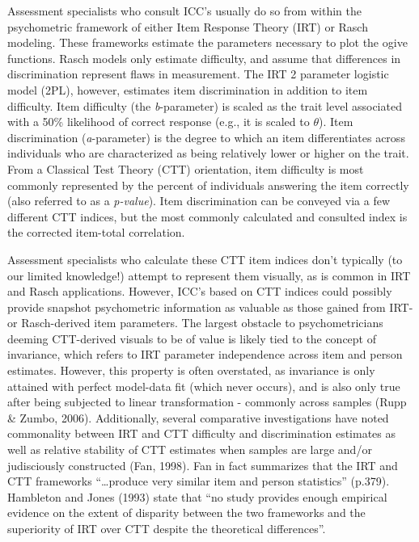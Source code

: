 \documentclass[
  man]{apa6}
\begin{document}
Assessment specialists who consult ICC's usually do so from within the psychometric framework of either Item Response Theory (IRT) or Rasch modeling. These frameworks estimate the parameters necessary to plot the ogive functions. Rasch models only estimate difficulty, and assume that differences in discrimination represent flaws in measurement. The IRT 2 parameter logistic model (2PL), however, estimates item discrimination in addition to item difficulty. Item difficulty (the \emph{b}-parameter) is scaled as the trait level associated with a 50\% likelihood of correct response (e.g., it is scaled to \(\theta\)). Item discrimination (\emph{a}-parameter) is the degree to which an item differentiates across individuals who are characterized as being relatively lower or higher on the trait. From a Classical Test Theory (CTT) orientation, item difficulty is most commonly represented by the percent of individuals answering the item correctly (also referred to as a \emph{p-value}). Item discrimination can be conveyed via a few different CTT indices, but the most commonly calculated and consulted index is the corrected item-total correlation.

Assessment specialists who calculate these CTT item indices don't typically (to our limited knowledge!) attempt to represent them visually, as is common in IRT and Rasch applications. However, ICC's based on CTT indices could possibly provide snapshot psychometric information as valuable as those gained from IRT- or Rasch-derived item parameters. The largest obstacle to psychometricians deeming CTT-derived visuals to be of value is likely tied to the concept of invariance, which refers to IRT parameter independence across item and person estimates. However, this property is often overstated, as invariance is only attained with perfect model-data fit (which never occurs), and is also only true after being subjected to linear transformation - commonly across samples (Rupp \& Zumbo, 2006). Additionally, several comparative investigations have noted commonality between IRT and CTT difficulty and discrimination estimates as well as relative stability of CTT estimates when samples are large and/or judisciously constructed (Fan, 1998). Fan in fact summarizes that the IRT and CTT frameworks ``\ldots produce very similar item and person statistics'' (p.379). Hambleton and Jones (1993) state that ``no study provides enough empirical evidence on the extent of disparity between the two frameworks and the superiority of IRT over CTT despite the theoretical differences''.
\end{document}
